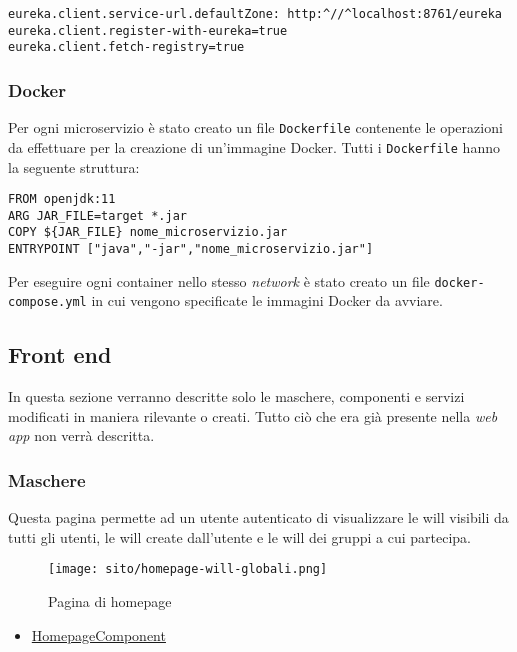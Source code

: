\begin{lstlisting}[style=Docker, caption = {Configurazione per la registrazione di un microservizio all'\texttt{Eureka Server} nel file \texttt{application.properties}}]
eureka.client.service-url.defaultZone: http:^//^localhost:8761/eureka
eureka.client.register-with-eureka=true
eureka.client.fetch-registry=true
\end{lstlisting}

\subsubsection{Docker}
Per ogni \gls{microservizio} è stato creato un file \texttt{Dockerfile}
contenente le operazioni da effettuare per la creazione di un'immagine Docker.
Tutti i \texttt{Dockerfile} hanno la seguente struttura:

\begin{lstlisting}[style=Docker]
FROM openjdk:11
ARG JAR_FILE=target *.jar
COPY ${JAR_FILE} nome_microservizio.jar
ENTRYPOINT ["java","-jar","nome_microservizio.jar"]
\end{lstlisting}

Per eseguire ogni \gls{container} nello stesso \textit{network} è stato creato
un file \texttt{docker-compose.yml} in cui vengono specificate le immagini
Docker da avviare.
\subsection{Front end}
In questa sezione verranno descritte solo le maschere, componenti e servizi
modificati in maniera rilevante o creati. Tutto ciò che era già presente nella
\textit{web app} non verrà descritta.
\subsubsection{Maschere}
Questa pagina permette ad un utente autenticato di visualizzare le \gls{will}
visibili da tutti gli utenti, le \gls{will} create dall'utente e le \gls{will}
dei gruppi a cui partecipa.
\begin{figure}[H]
    \centering
    \texttt{[image: sito/homepage-will-globali.png]}
    \caption{Pagina di homepage}
\end{figure}
\begin{itemize}
    \item \hyperref[par:HomepageComponent]{HomepageComponent}
\end{itemize}

